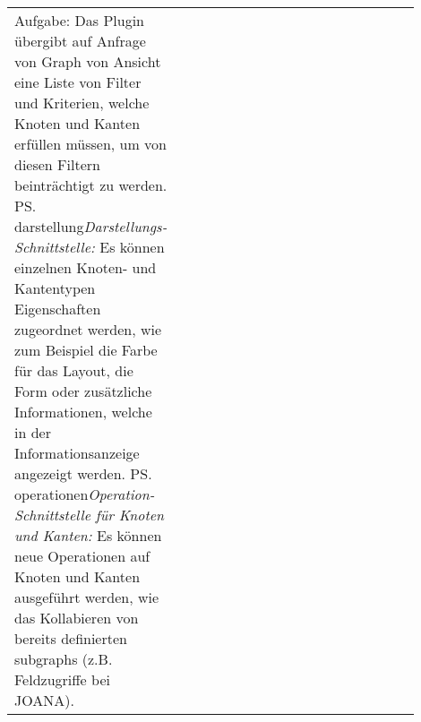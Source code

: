 \begin{tabular}{lp{0.9\linewidth}}
{    Aufgabe: Das Plugin übergibt auf Anfrage von Graph von Ansicht eine Liste von Filter und Kriterien, welche Knoten und Kanten erfüllen müssen, um von diesen Filtern beinträchtigt zu werden.}
  \ps{darstellung}{\textit{Darstellungs-Schnittstelle:} Es können einzelnen Knoten- und Kantentypen Eigenschaften zugeordnet werden, wie zum Beispiel die Farbe für das Layout, die Form oder zusätzliche Informationen, welche in der Informationsanzeige angezeigt werden.}
  \ps{operationen}{\textit{Operation-Schnittstelle für Knoten und Kanten:} Es können neue Operationen auf Knoten und Kanten ausgeführt werden, wie das Kollabieren von bereits definierten \glspl{subgraph} (z.B. Feldzugriffe bei JOANA).}
\end{tabular}
